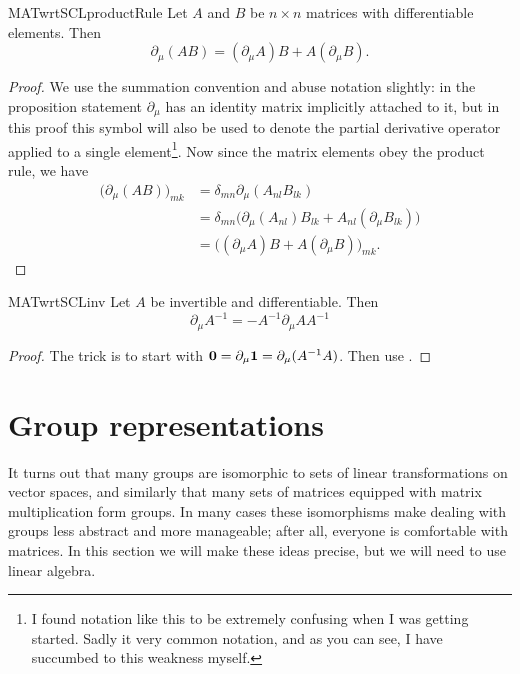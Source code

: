 \begin{proposition}{}{MATwrtSCLproductRule}
  Let $A$ and $B$ be $n\times n$ matrices with differentiable elements. Then
  $$
    \partial_\mu(AB)=(\partial_\mu A)B+A(\partial_\mu B).
  $$
  \begin{proof}
    We use the summation convention and abuse notation slightly: in the
    proposition statement $\partial_\mu$ has an identity matrix implicitly
    attached to it, but in this proof this symbol will also be used to
    denote the partial derivative operator applied to a single 
    element\footnote{I found notation like this to be extremely confusing
    when I was getting started. Sadly it very common notation, and as
    you can see, I have succumbed to this weakness myself.}. 
    Now since the matrix elements obey the product
    rule, we have
    \begin{equation*}
      \begin{aligned}
        \big(\partial_\mu(AB)\big)_{mk}
          &=\delta_{mn}\partial_\mu(A_{nl}B_{lk})\\
          &=\delta_{mn}\big(\partial_\mu(A_{nl})B_{lk}
                            +A_{nl}(\partial_\mu B_{lk})\big)\\
          &=\big((\partial_\mu A)B+A(\partial_\mu B)\big)_{mk}.
      \end{aligned}
    \end{equation*}
  \end{proof}
\end{proposition}

\begin{proposition}{}{MATwrtSCLinv}
Let $A$ be invertible and differentiable. Then
$$
\partial_\mu A^{-1}=-A^{-1}\partial_\mu A A^{-1}
$$
\begin{proof}
The trick is to start with ${\mathbf 0}=\partial_\mu{\mathbf 1}=\partial_\mu(A^{-1}A)$.
Then use .
\end{proof}
\end{proposition}



\section{Group representations}\label{sec:represent}


It turns out that many groups are isomorphic to sets of linear transformations
on vector spaces, and similarly that many sets of matrices equipped with matrix
multiplication form groups. In many cases these isomorphisms make dealing with
groups less abstract and more manageable; after all, everyone is comfortable
with matrices. In this section we will make these ideas precise, but we will
need to use linear algebra. 


